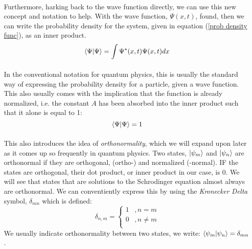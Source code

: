 \documentclass[12pt,letterpaper]{book}
\begin{document}
\paragraph*{}Furthermore, harking back to the wave function directly, we can use this new concept and notation to help. With the wave function, $\Psi(x,t)$, found, then we can write the probability density for the system, given in equation (\ref{prob density func}), as an inner product.
\begin{equation}
\label{inner prod integral}
\braket{\Psi}{\Psi} = \int \Psi^*(x,t) \Psi(x,t) dx
\end{equation}

\paragraph*{}In the conventional notation for quantum physics, this is usually the standard way of expressing the probability density for a particle, given a wave function. This also usually comes with the implication that the function is already normalized, i.e. the constant $A$ has been absorbed into the inner product such that it alone is equal to 1:
\begin{equation}
\braket{\Psi}{\Psi} = 1
\end{equation}

\paragraph*{}This also introduces the idea of \textit{orthonormality}, which we will expand upon later as it comes up so frequently in quantum physics. Two states, $\ket{\psi_m}$ and $\ket{\psi_n}$ are orthonormal if they are orthogonal, (ortho-) and normalized (-normal). IF the states are orthogonal, their dot product, or inner product in our case, is $0$. We will see that states that are solutions to the Schrodinger equation almost always are orthonormal. We can conventiently express this by using the \textit{Kronecker Delta} symbol, 
$\delta_{mn}$ which is defined:
\begin{equation}
\label{kronecker}
\delta_{n,m} = 
	\left\{
        \begin{array}{ll}
            1 	&, n = m \\
            0 	&, n \neq m \\
        \end{array}
    \right.
\end{equation}
We usually indicate orthonormality between two states, we write: $\braket{\psi_m}{\psi_n} = \delta_{mn}$.
\end{document}
